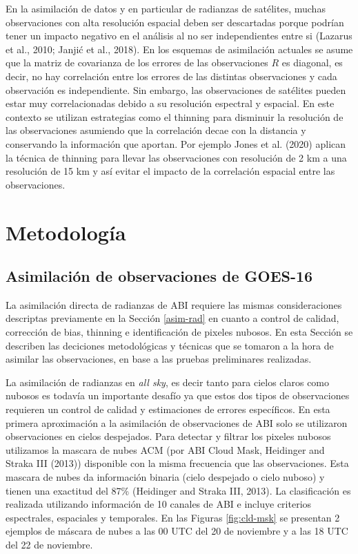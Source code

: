 \documentclass[12pt,oneside,a4paper]{reedthesis}
\begin{document}
En la asimilación de datos y en particular de radianzas de satélites, muchas observaciones con alta resolución espacial deben ser descartadas porque podrían tener un impacto negativo en el análisis al no ser independientes entre si (Lazarus et al., 2010; Janjić et al., 2018). En los esquemas de asimilación actuales se asume que la matriz de covarianza de los errores de las observaciones \(R\) es diagonal, es decir, no hay correlación entre los errores de las distintas observaciones y cada observación es independiente. Sin embargo, las observaciones de satélites pueden estar muy correlacionadas debido a su resolución espectral y espacial. En este contexto se utilizan estrategias como el thinning para disminuir la resolución de las observaciones asumiendo que la correlación decae con la distancia y conservando la información que aportan. Por ejemplo Jones et al. (2020) aplican la técnica de thinning para llevar las observaciones con resolución de 2 km a una resolución de 15 km y así evitar el impacto de la correlación espacial entre las observaciones.

\hypertarget{metodologuxeda-2}{%
\section{Metodología}\label{metodologuxeda-2}}

\hypertarget{asim-abi}{%
\subsection{Asimilación de observaciones de GOES-16}\label{asim-abi}}

La asimilación directa de radianzas de ABI requiere las mismas consideraciones descriptas previamente en la Sección \ref{asim-rad} en cuanto a control de calidad, corrección de bias, thinning e identificación de pixeles nubosos. En esta Sección se describen las deciciones metodológicas y técnicas que se tomaron a la hora de asimilar las observaciones, en base a las pruebas preliminares realizadas.

La asimilación de radianzas en \emph{all sky}, es decir tanto para cielos claros como nubosos es todavía un importante desafío ya que estos dos tipos de observaciones requieren un control de calidad y estimaciones de errores específicos. En esta primera aproximación a la asimilación de observaciones de ABI solo se utilizaron observaciones en cielos despejados. Para detectar y filtrar los pixeles nubosos utilizamos la mascara de nubes ACM (por ABI Cloud Mask, Heidinger and Straka III (2013)) disponible con la misma frecuencia que las observaciones. Esta mascara de nubes da información binaria (cielo despejado o cielo nuboso) y tienen una exactitud del 87\% (Heidinger and Straka III, 2013). La clasificación es realizada utilizando información de 10 canales de ABI e incluye criterios espectrales, espaciales y temporales. En las Figuras \ref{fig:cld-msk} se presentan 2 ejemplos de máscara de nubes a las 00 UTC del 20 de noviembre y a las 18 UTC del 22 de noviembre.
\end{document}
